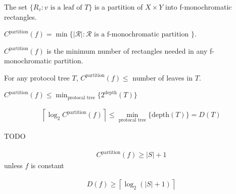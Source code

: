 \begin{prop}
The set $\{ R_v : v \text{ is a leaf of } T \}$ is a partition of $X \times Y$ into f-monochromatic rectangles.
\end{prop}

\begin{definition}[C-partition]
$C^{\text{partition}}(f) = \min\{ |\mathcal{R}| : \mathcal{R} \text{ is a f-monochromatic partition }\}$.
\end{definition}

$C^{\text{partition}}(f)$ is the minimum number of rectangles needed in any f-monochromatic partition.

\begin{corollary}
For any protocol tree $T$, $C^{\text{partition}}(f) \le $ number of leaves in $T$.
\end{corollary}

\begin{corollary}
$C^{\text{partition}}(f) \le \min_{\text{protocal tree}}\{ 2^{\text{depth}}(T)\}$
\end{corollary}

\begin{theorem}
    \begin{align*}
        \left\lceil \log_2 C^{\text{partition}}(f) \right\rceil  \le \min_{\text{protocal tree}}\{ \text{depth}(T)\} = D(T)
    \end{align*}
\end{theorem}

\begin{definition}
TODO
\end{definition}

\begin{prop}
\begin{align*}
    C^{\text{partition}}(f) \ge |S| + 1
\end{align*}
unless $f$ is constant
\end{prop}

\begin{corollary}
    \begin{align*}
        D(f) \ge \left\lceil \log_2 (|S| + 1) \right\rceil 
    \end{align*}
\end{corollary}

